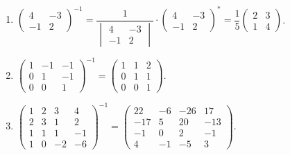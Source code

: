 	 \paragraph{} %
		 \begin{enumerate}
			 \item %
			       $\begin{pmatrix}
					       4  & -3 \\
					       -1 & 2
				       \end{pmatrix}^{-1} = \dfrac{1}{\begin{vmatrix}
						       4  & -3 \\
						       -1 & 2
					       \end{vmatrix}} \cdot \begin{pmatrix}
					       4  & -3 \\
					       -1 & 2
				       \end{pmatrix}^{*} = \dfrac{1}{5} \begin{pmatrix}
					       2 & 3 \\
					       1 & 4
				       \end{pmatrix}$.

			 \item %
			       $\begin{pmatrix}
					       1 & -1 & -1 \\
					       0 & 1  & -1 \\
					       0 & 0  & 1
				       \end{pmatrix}^{-1} = \begin{pmatrix}
					       1 & 1 & 2 \\
					       0 & 1 & 1 \\
					       0 & 0 & 1
				       \end{pmatrix}$.

			 \item %
			       $\begin{pmatrix}
					       1 & 2 & 3  & 4  \\
					       2 & 3 & 1  & 2  \\
					       1 & 1 & 1  & -1 \\
					       1 & 0 & -2 & -6
				       \end{pmatrix}^{-1} = \begin{pmatrix}
					       22  & -6 & -26 & 17  \\
					       -17 & 5  & 20  & -13 \\
					       -1  & 0  & 2   & -1  \\
					       4   & -1 & -5  & 3
				       \end{pmatrix}$.


\end{enumerate}
